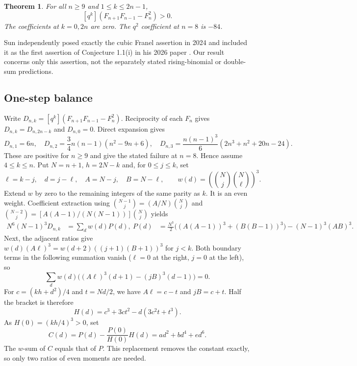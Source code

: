 \documentclass[11pt,a4paper]{article}
\newtheorem{SourceRbjMtheorem}{Theorem}
\begin{document}
\begin{SourceRbjMtheorem}\label{R19M:thm:main}
For all $n\ge9$ and $1\le k\le 2n-1$,
\[
  [q^k](F_{n+1}F_{n-1}-F_n^2)>0.
\]
The coefficients at $k=0,2n$ are zero. The $q^2$ coefficient at
$n=8$ is $-84$.
\end{SourceRbjMtheorem}
Sun independently posed exactly the cubic Franel assertion in 2024
\cite{R19M:MO} and included it as the first assertion of Conjecture 1.1(i)
in his 2026 paper \cite{R19M:Sun}. Our result concerns only this assertion,
not the separately stated rising-binomial or double-sum predictions.

\subsection{One-step balance}
Write $D_{n,k}=[q^k](F_{n+1}F_{n-1}-F_n^2)$.
Reciprocity of each $F_n$ gives $D_{n,k}=D_{n,2n-k}$ and
$D_{n,0}=0$. Direct expansion gives
\[
 D_{n,1}=6n,\quad D_{n,2}=\frac34 n(n-1)(n^2-9n+6),\quad
 D_{n,3}=\frac{n(n-1)^3}{6}(2n^3+n^2+20n-24).
\]
These are positive for $n\ge9$ and give the stated failure at $n=8$.
Hence assume $4\le k\le n$. Put $N=n+1$, $h=2N-k$ and, for
$0\le j\le k$, set
\[
 \ell=k-j,\quad d=j-\ell,\quad
 A=N-j,\quad B=N-\ell,\qquad
 w(d)=\left(\binom Nj\binom N\ell\right)^3.
\]
Extend $w$ by zero to the remaining integers of the same parity as $k$.
It is an even weight. Coefficient extraction using
$\binom{N-1}{j}=(A/N)\binom Nj$ and
$\binom{N-2}{j}=[A(A-1)/(N(N-1))]\binom Nj$ yields
\begin{align}
 N^6(N-1)^3 D_{n,k}&=\sum_d w(d)P(d),\
 P(d)&=\frac{N^3}{2}\bigl((A(A-1))^3+(B(B-1))^3\bigr)
                   -(N-1)^3(AB)^3.\label{R19M:eq:P}
\end{align}
Next, the adjacent ratios give
$w(d)(A\ell)^3=w(d+2)((j+1)(B+1))^3$ for $j<k$.
Both boundary terms in the following summation vanish
($\ell=0$ at the right, $j=0$ at the left), so
\[
 \sum_d w(d)\bigl((A\ell)^3(d+1)-(jB)^3(d-1)\bigr)=0.
\]
For $c=(kh+d^2)/4$ and $t=Nd/2$, we have $A\ell=c-t$ and $jB=c+t$.
Half the bracket is therefore
\[
 H(d)=c^3+3ct^2-d(3c^2t+t^3).
\]
As $H(0)=(kh/4)^3>0$, set
\begin{equation}\label{R19M:eq:C}
 C(d)=P(d)-\frac{P(0)}{H(0)}H(d)=a d^2+b d^4+e d^6.
\end{equation}
The $w$-sum of $C$ equals that of $P$. This replacement removes
the constant exactly, so only two ratios of even moments are needed.
\end{document}
